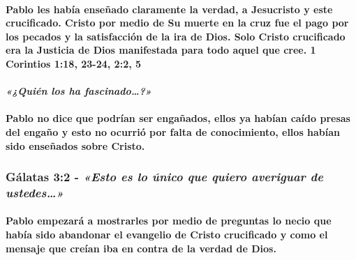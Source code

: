 \documentclass[11a pt,twoside]{article}
\newcommand{\scripture}[1]{%
  {\fontsize{12pt}{16pt}\selectfont\ScriptureFont\itshape #1}%
}
\def\textbf#1{#1}%
\let\oldsubsubsection\subsubsection
\renewcommand{\subsubsection}{\needspace{4\baselineskip}\oldsubsubsection}
\let\oldparagraph\paragraph
\renewcommand{\paragraph}{\needspace{3\baselineskip}\oldparagraph}
\begin{document}
\paragraph{\texorpdfstring{Pablo les había enseñado \textbf{claramente}
la verdad, a Jesucristo y este crucificado. Cristo por medio de Su
muerte en la cruz fue el pago por los pecados y la satisfacción de la
ira de Dios. Solo Cristo crucificado era la Justicia de Dios manifestada
para todo aquel que cree. 1 Corintios 1:18, 23-24, 2:2,
5}{Pablo les había enseñado claramente la verdad, a Jesucristo y este crucificado. Cristo por medio de Su muerte en la cruz fue el pago por los pecados y la satisfacción de la ira de Dios. Solo Cristo crucificado era la Justicia de Dios manifestada para todo aquel que cree. 1 Corintios 1:18, 23-24, 2:2, 5}}\label{pablo-les-habuxeda-enseuxf1ado-claramente-la-verdad-a-jesucristo-y-este-crucificado.-cristo-por-medio-de-su-muerte-en-la-cruz-fue-el-pago-por-los-pecados-y-la-satisfacciuxf3n-de-la-ira-de-dios.-solo-cristo-crucificado-era-la-justicia-de-dios-manifestada-para-todo-aquel-que-cree.-1-corintios-118-23-24-22-5}

\paragraph{\texorpdfstring{\scripture{«¿Quién los ha fascinado…?»}}{}}\label{quiuxe9n-los-ha-fascinado}

\paragraph{Pablo no dice que podrían ser engañados, ellos ya habían
caído presas del engaño y esto no ocurrió por falta de conocimiento,
ellos habían sido enseñados sobre
Cristo.}\label{pablo-no-dice-que-podruxedan-ser-engauxf1ados-ellos-ya-habuxedan-cauxeddo-presas-del-engauxf1o-y-esto-no-ocurriuxf3-por-falta-de-conocimiento-ellos-habuxedan-sido-enseuxf1ados-sobre-cristo.}

\subsubsection{\texorpdfstring{Gálatas 3:2 -
\scripture{«Esto es lo único que quiero averiguar de ustedes…»}}{Gálatas 3:2 - }}\label{guxe1latas-32---esto-es-lo-uxfanico-que-quiero-averiguar-de-ustedes}

\paragraph{Pablo empezará a mostrarles por medio de preguntas lo necio
que había sido abandonar el evangelio de Cristo crucificado y como el
mensaje que creían iba en contra de la verdad de
Dios.}\label{pablo-empezaruxe1-a-mostrarles-por-medio-de-preguntas-lo-necio-que-habuxeda-sido-abandonar-el-evangelio-de-cristo-crucificado-y-como-el-mensaje-que-creuxedan-iba-en-contra-de-la-verdad-de-dios.}
\end{document}
